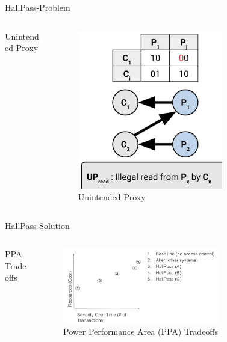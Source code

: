 \begin{frame}{HallPass-Problem}
    \begin{columns}
        \begin{column}{0.5\textwidth}
            Unintended Proxy
        \end{column}
        \begin{column}{0.5\textwidth}
            \begin{figure}
            \centering
            \includegraphics[height=0.7\textheight,width=0.7\textwidth,keepaspectratio]{proxy.png}
            \caption{Unintended Proxy}
        \end{figure}
        \end{column}
    \end{columns}
\end{frame}

\begin{frame}{HallPass-Solution}
    \begin{columns}
        \begin{column}{0.5\textwidth}
        PPA Tradeoffs
        \end{column}
        \begin{column}{0.5\textwidth}
            \begin{figure}
            \centering
            \includegraphics[height=0.7\textheight,width=0.7\textwidth,keepaspectratio]{tradeoffs.png}
            \caption{Power Performance Area (PPA) Tradeoffs}
            \end{figure}
        \end{column}
    \end{columns}
\end{frame}

